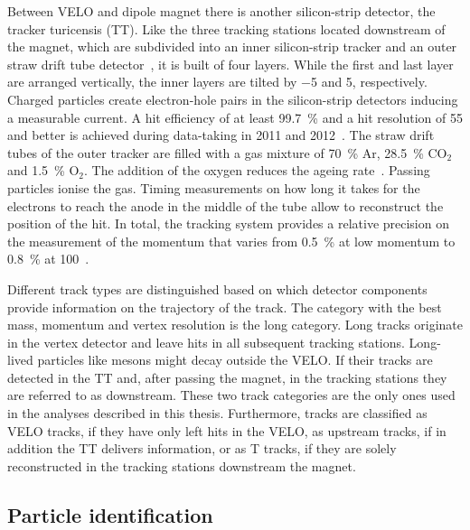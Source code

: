 Between VELO and dipole magnet there is another silicon-strip detector, the
tracker turicensis (TT). Like the three tracking stations located downstream
of the magnet, which are subdivided into an inner silicon-strip tracker and an
outer straw drift tube detector~\cite{LHCb-DP-2013-003}, it is built of four
layers. While the first and last layer are arranged vertically, the inner
layers are tilted by \SI{-5}{\degrees} and \SI{+5}{\degrees}, respectively.
Charged particles create electron-hole pairs in the silicon-strip detectors
inducing a measurable current. A hit efficiency of at least
\SI{99.7}{\percent} and a hit resolution of \SI{55}{\mum} and better is
achieved during data-taking in 2011 and 2012~\cite{LHCb-DP-2014-002}. The
straw drift tubes of the outer tracker are filled with a gas mixture of
\SI{70}{\percent} Ar, \SI{28.5}{\percent} CO$_2$ and \SI{1.5}{\percent} O$_2$.
The addition of the oxygen reduces the ageing rate~\cite{Bachmann:2010zz}.
Passing particles ionise the gas. Timing measurements on how long it takes for
the electrons to reach the anode in the middle of the tube allow to
reconstruct the position of the hit. In total, the tracking system provides a
relative precision on the measurement of the momentum that varies from
\SI{0.5}{\percent} at low momentum to \SI{0.8}{\percent} at
\SI{100}{\gevc}~\cite{LHCb-DP-2014-002}.

Different track types are distinguished based on which detector components
provide information on the trajectory of the track. The category with the best
mass, momentum and vertex resolution is the long category. Long tracks
originate in the vertex detector and leave hits in all subsequent tracking
stations. Long-lived particles like \KS mesons might decay outside the VELO.
If their tracks are detected in the TT and, after passing the magnet, in the
tracking stations they are referred to as downstream. These two track
categories are the only ones used in the analyses described in this thesis.
Furthermore, tracks are classified as VELO tracks, if they have only left hits
in the VELO, as upstream tracks, if in addition the TT delivers information,
or as T tracks, if they are solely reconstructed in the tracking stations
downstream the magnet.


\subsection*{Particle identification}
\label{subsec:teilchenidentifizierung}

